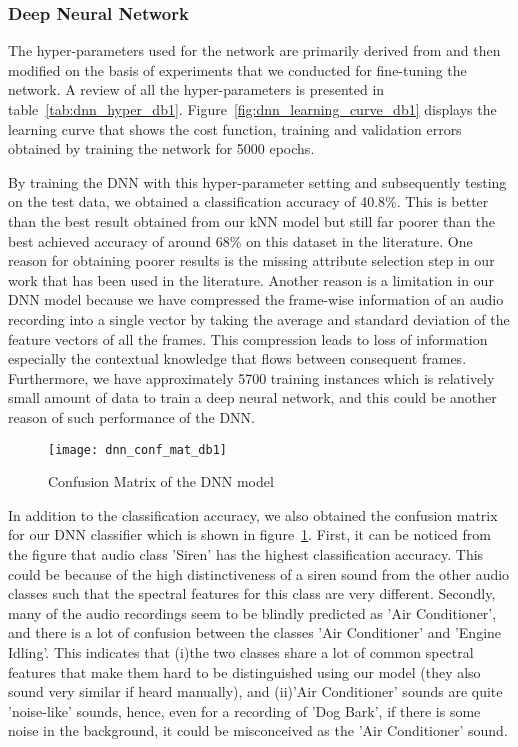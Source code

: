 \subsubsection{Deep Neural Network}
The hyper-parameters used for the network are primarily derived from \cite{gencoglu2014recognition} and then modified on the basis of experiments that we conducted for fine-tuning the network. A review of all the hyper-parameters is presented in table~\ref{tab:dnn_hyper_db1}. Figure~\ref{fig:dnn_learning_curve_db1} displays the learning curve that shows the cost function, training and validation errors obtained by training the network for 5000 epochs.

By training the DNN with this hyper-parameter setting and subsequently testing on the test data, we obtained a classification accuracy of 40.8\%. This is better than the best result obtained from our kNN model but still far poorer than the best achieved accuracy of around 68\% on this dataset in the literature. One reason for obtaining poorer results is the missing attribute selection step in our work that has been used in the literature. Another reason is a limitation in our DNN model because we have compressed the frame-wise information of an audio recording into a single vector by taking the average and standard deviation of the feature vectors of all the frames. This compression leads to loss of information especially the contextual knowledge that flows between consequent frames. Furthermore, we have approximately 5700 training instances which is relatively small amount of data to train a deep neural network, and this could be another reason of such performance of the DNN.

\begin{figure}[!htb] 
\centering 
\texttt{[image: dnn\_conf\_mat\_db1]} 
\caption[Confusion Matrix DNN]{Confusion Matrix of the DNN model}
\label{fig:dnn_conf_mat_db1} 
\end{figure}

In addition to the classification accuracy, we also obtained the confusion matrix for our DNN classifier which is shown in figure~\ref{fig:dnn_conf_mat_db1}. First, it can be noticed from the figure that audio class 'Siren' has the highest classification accuracy. This could be because of the high distinctiveness of a siren sound from the other audio classes such that the spectral features for this class are very different. Secondly, many of the audio recordings seem to be blindly predicted as 'Air Conditioner', and there is a lot of confusion between the classes 'Air Conditioner' and 'Engine Idling'. This indicates that (i)the two classes share a lot of common spectral features that make them hard to be distinguished using our model (they also sound very similar if heard manually), and (ii)'Air Conditioner' sounds are quite 'noise-like' sounds, hence, even for a recording of 'Dog Bark', if there is some noise in the background, it could be misconceived as the 'Air Conditioner' sound. 

